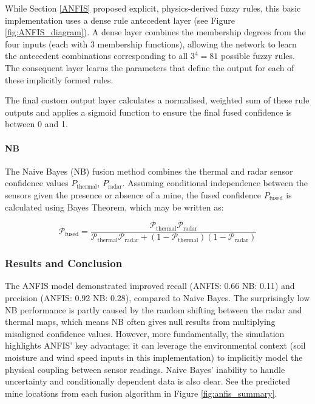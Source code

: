     While Section \ref{ANFIS} proposed explicit, physics-derived fuzzy rules, this basic implementation uses a dense rule antecedent layer (see Figure \ref{fig:ANFIS_diagram}). A dense layer combines the membership degrees from the four inputs (each with 3 membership functions), allowing the network to learn the antecedent combinations corresponding to all $3^4=81$ possible fuzzy rules. The consequent layer learns the parameters that define the output for each of these implicitly formed rules. 
    
    The final custom output layer calculates a normalised, weighted sum of these rule outputs and applies a sigmoid function to ensure the final fused confidence is between 0 and 1.

    \paragraph{NB} The Naive Bayes (NB) fusion method combines the thermal and radar sensor confidence values $P_{\text{thermal}}$, $P_{\text{radar}}$. Assuming conditional independence between the sensors given the presence or absence of a mine, the fused confidence $P_{\text{fused}}$ is calculated using Bayes Theorem, which may be written as:

    \begin{equation}
        \label{eq:bayes_fusion}
        \mathcal{P}_\text{fused} = \frac{\mathcal{P}_\text{thermal}\mathcal{P}_\text{radar}}{\mathcal{P}_\text{thermal}\mathcal{P}_\text{radar} + (1-\mathcal{P}_\text{thermal})(1-\mathcal{P}_\text{radar})}
    \end{equation}
    
\subsubsection{Results and Conclusion}  

    The ANFIS model demonstrated improved recall (ANFIS: 0.66 NB: 0.11) and precision (ANFIS: 0.92 NB: 0.28), compared to Naive Bayes. The surprisingly low NB performance is partly caused by the random shifting between the radar and thermal maps, which means NB often gives null results from multiplying misaligned confidence values. However, more fundamentally, the simulation highlights ANFIS' key advantage; it can leverage the environmental context (soil moisture and wind speed inputs in this implementation) to implicitly model the physical coupling between sensor readings. Naive Bayes' inability to handle uncertainty and conditionally dependent data is also clear. See the predicted mine locations from each fusion algorithm in Figure \ref{fig:anfis_summary}.

